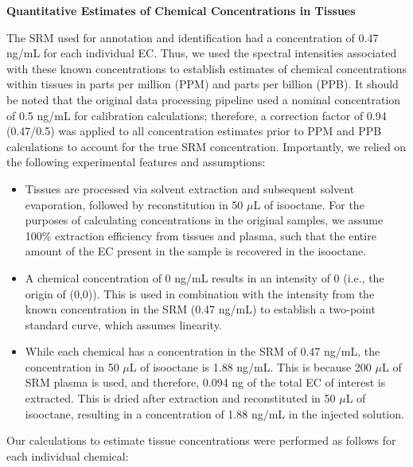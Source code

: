 \vspace{1em}

\noindent\textbf{Quantitative Estimates of Chemical Concentrations in Tissues}

The SRM used for annotation and identification had a concentration of 0.47 ng/mL for each individual EC. Thus, we used the spectral intensities associated with these known concentrations to establish estimates of chemical concentrations within tissues in parts per million (PPM) and parts per billion (PPB). It should be noted that the original data processing pipeline used a nominal concentration of 0.5 ng/mL for calibration calculations; therefore, a correction factor of 0.94 (0.47/0.5) was applied to all concentration estimates prior to PPM and PPB calculations to account for the true SRM concentration. Importantly, we relied on the following experimental features and assumptions:

\begin{itemize}
\item Tissues are processed via solvent extraction and subsequent solvent evaporation, followed by reconstitution in 50 $\mu$L of isooctane. For the purposes of calculating concentrations in the original samples, we assume 100\% extraction efficiency from tissues and plasma, such that the entire amount of the EC present in the sample is recovered in the isooctane.
\item A chemical concentration of 0 ng/mL results in an intensity of 0 (i.e., the origin of (0,0)). This is used in combination with the intensity from the known concentration in the SRM (0.47 ng/mL) to establish a two-point standard curve, which assumes linearity.
\item While each chemical has a concentration in the SRM of 0.47 ng/mL, the concentration in 50 $\mu$L of isooctane is 1.88 ng/mL. This is because 200 $\mu$L of SRM plasma is used, and therefore, 0.094 ng of the total EC of interest is extracted. This is dried after extraction and reconstituted in 50 $\mu$L of isooctane, resulting in a concentration of 1.88 ng/mL in the injected solution.
\end{itemize}

Our calculations to estimate tissue concentrations were performed as follows for each individual chemical:

